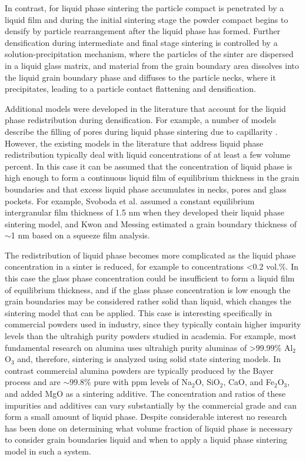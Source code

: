 In contrast, for liquid phase sintering \cite{Kingery2004} the particle compact is penetrated by a liquid film and during the initial sintering stage the powder compact begins to densify by particle rearrangement after the liquid phase has formed. Further densification during intermediate and final stage sintering is controlled by a solution-precipitation mechanism, where the particles of the sinter are dispersed in a liquid glass matrix, and material from the grain boundary area dissolves into the liquid grain boundary phase and diffuses to the particle necks, where it precipitates, leading to a particle contact flattening and densification.

Additional models were developed in the literature that account for the liquid phase redistribution during densification. For example, a number of models describe the filling of pores during liquid phase sintering due to capillarity \cite{Lee1998,Shaw1986}. However, the existing models in the literature that address liquid phase redistribution typically deal with liquid concentrations of at least a few volume percent. In this case it can be assumed that the concentration of liquid phase is high enough to form a continuous liquid film of equilibrium thickness \cite{Subramaniam2006,Clarke1987,Clarke1993} in the grain boundaries and that excess liquid phase accumulates in necks, pores and glass pockets. For example, Svoboda et al.\cite{Svoboda1996} assumed a constant equilibrium intergranular film thickness of 1.5 nm when they developed their liquid phase sintering model, and Kwon and Messing \cite{Kwon1991} estimated a grain boundary thickness of $\sim$1 nm based on a squeeze film analysis. 

The redistribution of liquid phase becomes more complicated as the liquid phase concentration in a sinter is reduced, for example to concentrations <0.2 vol.\%. In this case the glass phase concentration could be insufficient to form a liquid film of equilibrium thickness, and if the glass phase concentration is low enough the grain boundaries may be considered rather solid than liquid, which changes the sintering model that can be applied. This case is interesting specifically in commercial powders used in industry, since they typically contain higher impurity levels than the ultrahigh purity powders studied in academia. For example, most fundamental research on alumina uses ultrahigh purity aluminas of >99.99\% Al$_{2}$O$_{3}$ and, therefore, sintering is analyzed using solid state sintering models. In contrast commercial alumina powders are typically produced by the Bayer process and are $\sim$99.8\% pure with ppm levels of Na$_{2}$O, SiO$_{2}$, CaO, and Fe$_{2}$O$_{3}$, and added MgO as a sintering additive. The concentration and ratios of these impurities and additives can vary substantially by the commercial grade and can form a small amount of liquid phase. Despite considerable interest no research has been done on determining what volume fraction of liquid phase is necessary to consider grain boundaries liquid and when to apply a liquid phase sintering model in such a system. 

